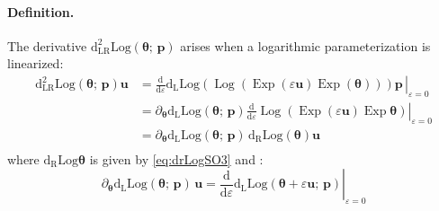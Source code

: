 \paragraph*{Definition.}
The derivative \(\operatorname{d^2_{\scriptscriptstyle{LR}}Log}\left(\bm{\theta}; \, \bm{p}\right)\) arises when a logarithmic parameterization is linearized:
%
\begin{equation*} 
\begin{aligned}
\operatorname{d^2_{\scriptscriptstyle{LR}}Log}\left(\bm{\theta}; \, \bm{p}\right)\bm{u}
&= \left.\frac{\mathrm{d}}{\mathrm{d} \varepsilon} \operatorname{d_{\scriptscriptstyle{L}}Log} \left(\operatorname{Log}\left(\operatorname{Exp}(\varepsilon \bm{u})\operatorname{Exp}(\bm{\theta})\right) \right)  \bm{p} \,\right|_{\varepsilon=0} \\
%
&=\partial_{\bm{\theta}}\operatorname{d_{\scriptscriptstyle{L}}Log}\left({\bm{\theta}}; \, \bm{p}\right) 
  \left.\frac{\mathrm{d}}{\mathrm{d}\varepsilon} \operatorname{Log} \left( \operatorname{Exp} (\varepsilon \bm{u}) \operatorname{Exp} \bm{\theta}\right) \right|_{\varepsilon=0} \\
%
  &= \partial_{\bm{\theta}}\operatorname{d_{\scriptscriptstyle{L}}Log}\left({\bm{\theta}}; \, \bm{p}\right)\, \operatorname{d_{\scriptscriptstyle{R}}Log}\left({\bm{\theta}}\right)  \bm{u} \\
\end{aligned}
\end{equation*}
where \(\operatorname{d_{\scriptscriptstyle{R}}Log} {\bm{\theta}}\) is given by \eqref{eq:drLogSO3} and :
\begin{equation*}
\partial_{\bm{\theta}} \operatorname{d_{\scriptscriptstyle{L}}Log}\left({\bm{\theta}}; \, \bm{p}\right) \, \bm{u}
= \left.\frac{\mathrm{d}}{\mathrm{d}\varepsilon}\operatorname{d_{\scriptscriptstyle{L}}Log}\left({\bm{\theta}+\varepsilon \bm{u}};\,  \bm{p}\right)\right|_{\varepsilon=0}
\end{equation*}

%
